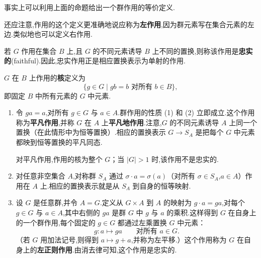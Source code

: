 事实上可以利用上面的命题给出一个群作用的等价定义.

还应注意,作用的这个定义更准确地说应称为\textbf{左作用},因为群元素写在集合元素的左边.类似地也可以定义右作用.

	\begin{definition}
		若 $G$ 作用在集合 $B$ 上,且 $G$ 的不同元素诱导 $B$ 上不同的置换,则称该作用是\textbf{忠实的}(faithful).因此,忠实作用正是相应置换表示为单射的作用.

	\end{definition}
\begin{definition}
	$G$ 在 $B$ 上作用的\textbf{核}定义为
\[
\{g\in G\mid gb=b\text{ 对所有 }b\in B\},
\]
即固定 $B$ 中所有元素的 $G$ 中元素.
\end{definition}
\begin{example}
	\begin{enumerate}[label=(\arabic*)]
	\item 令 $ga=a$,对所有 $g\in G$ 与 $a\in A$.群作用的性质 (1) 和 (2) 立即成立.这个作用称为\textbf{平凡作用},并称 $G$ 在 $A$ 上\textbf{平凡地作用}.注意,$G$ 的不同元素诱导 $A$ 上同一个置换（在此情形中为恒等置换）.相应的置换表示 $G\to S_A$ 是把每个 $G$ 中元素都映到恒等置换的平凡同态.
	
	对平凡作用,作用的核为整个 $G$；当 $|G|>1$ 时,该作用不是忠实的.
	
	\item 对任意非空集合 $A$,对称群 $S_A$ 通过 $\sigma\cdot a=\sigma(a)$（对所有 $\sigma\in S_A$,$a\in A$）作用在 $A$ 上.相应的置换表示就是从 $S_A$ 到自身的恒等映射.
	\item 设 $G$ 是任意群,并令 $A=G$.定义从 $G\times A$ 到 $A$ 的映射为 $g\cdot a=ga$,对每个 $g\in G$ 与 $a\in A$,其中右侧的 $ga$ 是群 $G$ 中 $g$ 与 $a$ 的乘积.这样得到 $G$ 在自身上的一个群作用,每个固定的 $g\in G$ 都通过左乘置换 $G$ 中元素：
	\[
	g:a\mapsto ga\qquad\text{对所有 }a\in G.
	\]
	（若 $G$ 用加法记号,则得到 $a\mapsto g+a$,并称为左平移.）这个作用称为 $G$ 在自身上的\textbf{左正则作用}.由消去律可知,这个作用是忠实的.
\end{enumerate}
\end{example}